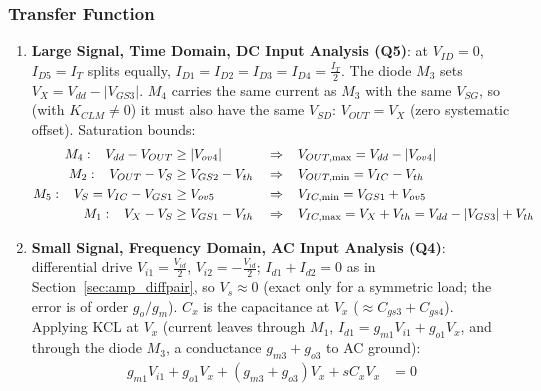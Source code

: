\subsubsection{Transfer Function}
\begin{enumerate}
  \item \textbf{Large Signal, Time Domain, DC Input Analysis (Q5)}:
    at \(V_{ID} = 0\), \(I_{D5} = I_T\) splits equally,
    \(I_{D1} = I_{D2} = I_{D3} = I_{D4} = \frac{I_T}{2}\). The diode \(M_3\)
    sets \(V_X = V_{dd} - |V_{GS3}|\). \(M_4\) carries the same current as
    \(M_3\) with the same \(V_{SG}\), so (with \(K_{CLM} \neq 0\)) it must also have
    the same \(V_{SD}\): \(V_{OUT} = V_X\) (zero systematic offset). Saturation bounds:
    \begin{align*}
      M_4: \hspace{0.3cm} V_{dd} - V_{OUT} &\geq |V_{ov4}| &&\Rightarrow\hspace{0.3cm} V_{OUT,\max} = V_{dd} - |V_{ov4}| \\
      M_2: \hspace{0.3cm} V_{OUT} - V_S &\geq V_{GS2} - V_{th} &&\Rightarrow\hspace{0.3cm} V_{OUT,\min} = V_{IC} - V_{th} \\
      M_5: \hspace{0.3cm} V_S = V_{IC} - V_{GS1} &\geq V_{ov5} &&\Rightarrow\hspace{0.3cm} V_{IC,\min} = V_{GS1} + V_{ov5} \\
      M_1: \hspace{0.3cm} V_X - V_S &\geq V_{GS1} - V_{th} &&\Rightarrow\hspace{0.3cm} V_{IC,\max} = V_X + V_{th} = V_{dd} - |V_{GS3}| + V_{th}
    \end{align*}
  \item \textbf{Small Signal, Frequency Domain, AC Input Analysis (Q4)}:
    differential drive \(V_{i1} = \frac{V_{id}}{2}\), \(V_{i2} = -\frac{V_{id}}{2}\);
    \(I_{d1} + I_{d2} = 0\) as in Section~\ref{sec:amp_diffpair}, so
    \(V_s \approx 0\) (exact only for a symmetric load; the error is of order
    \(g_o/g_m\)). \(C_x\) is the capacitance at \(V_x\) (\(\approx C_{gs3} + C_{gs4}\)).\\
    Applying KCL at \(V_x\) (current leaves through \(M_1\), \(I_{d1} = g_{m1} V_{i1} + g_{o1} V_x\),
    and through the diode \(M_3\), a conductance \(g_{m3} + g_{o3}\) to AC ground):
    \begin{align*}
      g_{m1} V_{i1} + g_{o1} V_x + (g_{m3} + g_{o3}) V_x + sC_x V_x &= 0 \\

\end{align*}
\end{enumerate}
